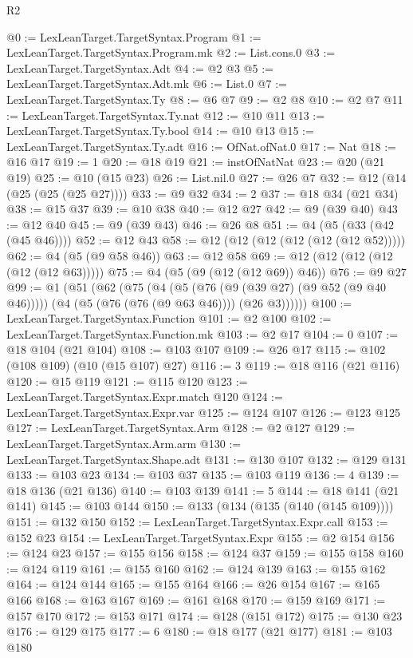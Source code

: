 \begin{lexlean}{R2}
\begin{coremodule}
@0 := LexLeanTarget.TargetSyntax.Program
@1 := LexLeanTarget.TargetSyntax.Program.mk
@2 := List.cons.{0}
@3 := LexLeanTarget.TargetSyntax.Adt
@4 := @2 @3
@5 := LexLeanTarget.TargetSyntax.Adt.mk
@6 := List.{0}
@7 := LexLeanTarget.TargetSyntax.Ty
@8 := @6 @7
@9 := @2 @8
@10 := @2 @7
@11 := LexLeanTarget.TargetSyntax.Ty.nat
@12 := @10 @11
@13 := LexLeanTarget.TargetSyntax.Ty.bool
@14 := @10 @13
@15 := LexLeanTarget.TargetSyntax.Ty.adt
@16 := OfNat.ofNat.{0}
@17 := Nat
@18 := @16 @17
@19 := 1
@20 := @18 @19
@21 := instOfNatNat
@23 := @20 (@21 @19)
@25 := @10 (@15 @23)
@26 := List.nil.{0}
@27 := @26 @7
@32 := @12 (@14 (@25 (@25 (@25 @27))))
@33 := @9 @32
@34 := 2
@37 := @18 @34 (@21 @34)
@38 := @15 @37
@39 := @10 @38
@40 := @12 @27
@42 := @9 (@39 @40)
@43 := @12 @40
@45 := @9 (@39 @43)
@46 := @26 @8
@51 := @4 (@5 (@33 (@42 (@45 @46))))
@52 := @12 @43
@58 := @12 (@12 (@12 (@12 (@12 (@12 @52)))))
@62 := @4 (@5 (@9 @58 @46))
@63 := @12 @58
@69 := @12 (@12 (@12 (@12 (@12 (@12 @63)))))
@75 := @4 (@5 (@9 (@12 (@12 @69)) @46))
@76 := @9 @27
@99 := @1
    (@51
      (@62
        (@75
          (@4
            (@5 (@76 (@9 (@39 @27) (@9 @52 (@9 @40 @46)))))
            (@4 (@5 (@76 (@76 (@9 @63 @46)))) (@26 @3))))))
@100 := LexLeanTarget.TargetSyntax.Function
@101 := @2 @100
@102 := LexLeanTarget.TargetSyntax.Function.mk
@103 := @2 @17
@104 := 0
@107 := @18 @104 (@21 @104)
@108 := @103 @107
@109 := @26 @17
@115 := @102 (@108 @109) (@10 (@15 @107) @27)
@116 := 3
@119 := @18 @116 (@21 @116)
@120 := @15 @119
@121 := @115 @120
@123 := LexLeanTarget.TargetSyntax.Expr.match @120
@124 := LexLeanTarget.TargetSyntax.Expr.var
@125 := @124 @107
@126 := @123 @125
@127 := LexLeanTarget.TargetSyntax.Arm
@128 := @2 @127
@129 := LexLeanTarget.TargetSyntax.Arm.arm
@130 := LexLeanTarget.TargetSyntax.Shape.adt
@131 := @130 @107
@132 := @129 @131
@133 := @103 @23
@134 := @103 @37
@135 := @103 @119
@136 := 4
@139 := @18 @136 (@21 @136)
@140 := @103 @139
@141 := 5
@144 := @18 @141 (@21 @141)
@145 := @103 @144
@150 := @133 (@134 (@135 (@140 (@145 @109))))
@151 := @132 @150
@152 := LexLeanTarget.TargetSyntax.Expr.call
@153 := @152 @23
@154 := LexLeanTarget.TargetSyntax.Expr
@155 := @2 @154
@156 := @124 @23
@157 := @155 @156
@158 := @124 @37
@159 := @155 @158
@160 := @124 @119
@161 := @155 @160
@162 := @124 @139
@163 := @155 @162
@164 := @124 @144
@165 := @155 @164
@166 := @26 @154
@167 := @165 @166
@168 := @163 @167
@169 := @161 @168
@170 := @159 @169
@171 := @157 @170
@172 := @153 @171
@174 := @128 (@151 @172)
@175 := @130 @23
@176 := @129 @175
@177 := 6
@180 := @18 @177 (@21 @177)
@181 := @103 @180

\end{coremodule}
\end{lexlean}
